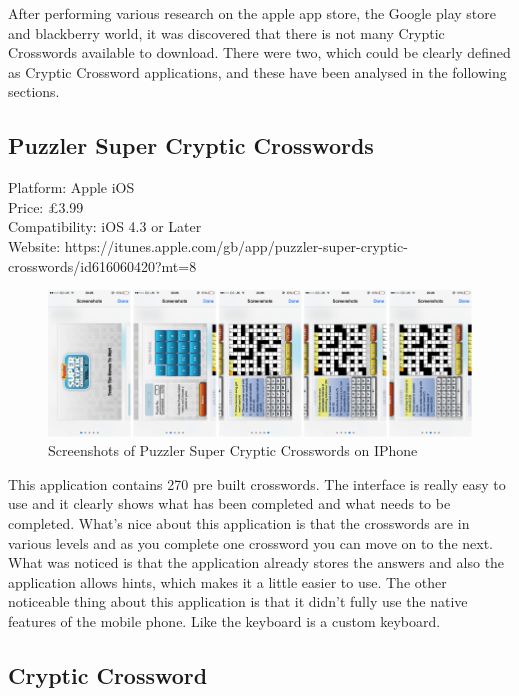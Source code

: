After performing various research on the apple app store, the Google play store and blackberry world, it was discovered that there is not many Cryptic Crosswords available to download. There were two, which could be clearly defined as Cryptic Crossword applications, and these have been analysed in the following sections.

\subsection{Puzzler Super Cryptic Crosswords}

Platform: Apple iOS \\
Price: \pounds3.99 \\
Compatibility: iOS 4.3 or Later \\
Website: https://itunes.apple.com/gb/app/puzzler-super-cryptic-crosswords/id616060420?mt=8

\begin{figure}[!ht]
    \includegraphics[width=\linewidth]{research/mobile_platforms/pscs.png}
    \caption{Screenshots of Puzzler Super Cryptic Crosswords on IPhone}
\end{figure}

This application contains 270 pre built crosswords. The interface is really easy to use and it clearly shows what has been completed and what needs to be completed. What’s nice about this application is that the crosswords are in various levels and as you complete one crossword you can move on to the next. What was noticed is that the application already stores the answers and also the application allows hints, which makes it a little easier to use. The other noticeable thing about this application is that it didn’t fully use the native features of the mobile phone. Like the keyboard is a custom keyboard. 


\subsection{Cryptic Crossword}

